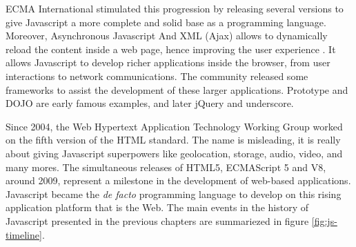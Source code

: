 ECMA International stimulated this progression by releasing several versions to give Javascript a more complete and solid base as a programming language.
Moreover, %
Asynchronous Javascript And XML (Ajax) allows to dynamically reload the content inside a web page, hence improving the user experience \cite{Garrett2005}.
It allows Javascript to develop richer applications inside the browser, from user interactions to network communications.
The community released some frameworks to assist the development of these larger applications.
Prototype and DOJO are early famous examples, and later jQuery and underscore.


Since 2004, the Web Hypertext Application Technology Working Group worked on the fifth version of the HTML standard.
The name is misleading, it is really about giving Java\-script superpowers like geolocation, storage, audio, video, and many mores.
The simultaneous releases of HTML5, ECMAScript 5 and V8, around 2009, represent a milestone in the development of web-based applications.
Java\-script became the \textit{de facto} programming language to develop on this rising application platform that is the Web.
The main events in the history of Java\-script presented in the previous chapters are summariezed in figure \ref{fig:js-timeline}.

